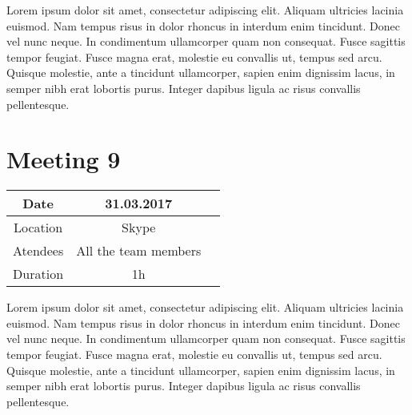 Lorem ipsum dolor sit amet, consectetur adipiscing elit. Aliquam ultricies lacinia euismod. Nam tempus risus in dolor rhoncus in interdum enim tincidunt. Donec vel nunc neque. In condimentum ullamcorper quam non consequat. Fusce sagittis tempor feugiat. Fusce magna erat, molestie eu convallis ut, tempus sed arcu. Quisque molestie, ante a tincidunt ullamcorper, sapien enim dignissim lacus, in semper nibh erat lobortis purus. Integer dapibus ligula ac risus convallis pellentesque.

\section{Meeting 9}
\begin{center}
	\begin{tabular}{| c | c | c }
		\hline
		Date & 	31.03.2017   \\
		\hline
		Location & Skype  \\
		\hline
		Atendees & All the team members   \\
		\hline
		Duration & 1h  \\
		\hline
	\end{tabular}
\end{center}


Lorem ipsum dolor sit amet, consectetur adipiscing elit. Aliquam ultricies lacinia euismod. Nam tempus risus in dolor rhoncus in interdum enim tincidunt. Donec vel nunc neque. In condimentum ullamcorper quam non consequat. Fusce sagittis tempor feugiat. Fusce magna erat, molestie eu convallis ut, tempus sed arcu. Quisque molestie, ante a tincidunt ullamcorper, sapien enim dignissim lacus, in semper nibh erat lobortis purus. Integer dapibus ligula ac risus convallis pellentesque.

